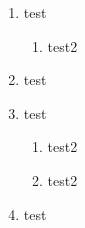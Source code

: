 \documentclass[12pt]{article}
\begin{document}
\begin{enumerate}
    \item test
        \begin{enumerate}
            \item test2

        \end{enumerate}
    \item test
    \item test
        \begin{enumerate}
            \item test2
            \item test2
        \end{enumerate}
    \item test
\end{enumerate}
\end{document}
